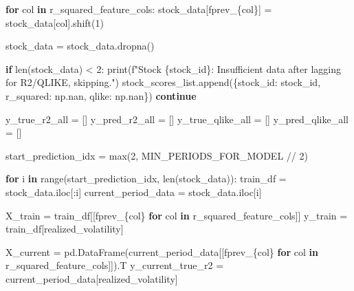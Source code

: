 \documentclass[
  letterpaper,
  DIV=11,
  numbers=noendperiod]{scrartcl}
\newenvironment{Shaded}{\begin{snugshade}}{\end{snugshade}}
\newcommand{\BuiltInTok}[1]{\textcolor[rgb]{0.00,0.23,0.31}{#1}}
\newcommand{\ControlFlowTok}[1]{\textcolor[rgb]{0.00,0.23,0.31}{\textbf{#1}}}
\newcommand{\DecValTok}[1]{\textcolor[rgb]{0.68,0.00,0.00}{#1}}
\newcommand{\KeywordTok}[1]{\textcolor[rgb]{0.00,0.23,0.31}{\textbf{#1}}}
\newcommand{\NormalTok}[1]{\textcolor[rgb]{0.00,0.23,0.31}{#1}}
\newcommand{\OperatorTok}[1]{\textcolor[rgb]{0.37,0.37,0.37}{#1}}
\newcommand{\SpecialCharTok}[1]{\textcolor[rgb]{0.37,0.37,0.37}{#1}}
\newcommand{\SpecialStringTok}[1]{\textcolor[rgb]{0.13,0.47,0.30}{#1}}
\newcommand{\StringTok}[1]{\textcolor[rgb]{0.13,0.47,0.30}{#1}}
\begin{document}
\begin{Shaded}
\begin{Highlighting}[]
    \ControlFlowTok{for}\NormalTok{ col }\KeywordTok{in}\NormalTok{ r\_squared\_feature\_cols:}
\NormalTok{        stock\_data[}\SpecialStringTok{f\textquotesingle{}prev\_}\SpecialCharTok{\{}\NormalTok{col}\SpecialCharTok{\}}\SpecialStringTok{\textquotesingle{}}\NormalTok{] }\OperatorTok{=}\NormalTok{ stock\_data[col].shift(}\DecValTok{1}\NormalTok{)}
    
\NormalTok{    stock\_data }\OperatorTok{=}\NormalTok{ stock\_data.dropna() }

    \ControlFlowTok{if} \BuiltInTok{len}\NormalTok{(stock\_data) }\OperatorTok{\textless{}} \DecValTok{2}\NormalTok{: }
        \BuiltInTok{print}\NormalTok{(}\SpecialStringTok{f"Stock }\SpecialCharTok{\{}\NormalTok{stock\_id}\SpecialCharTok{\}}\SpecialStringTok{: Insufficient data after lagging for R2/QLIKE, skipping."}\NormalTok{)}
\NormalTok{        stock\_scores\_list.append(\{}\StringTok{\textquotesingle{}stock\_id\textquotesingle{}}\NormalTok{: stock\_id, }\StringTok{\textquotesingle{}r\_squared\textquotesingle{}}\NormalTok{: np.nan, }\StringTok{\textquotesingle{}qlike\textquotesingle{}}\NormalTok{: np.nan\})}
        \ControlFlowTok{continue}

\NormalTok{    y\_true\_r2\_all }\OperatorTok{=}\NormalTok{ []}
\NormalTok{    y\_pred\_r2\_all }\OperatorTok{=}\NormalTok{ []}
\NormalTok{    y\_true\_qlike\_all }\OperatorTok{=}\NormalTok{ []}
\NormalTok{    y\_pred\_qlike\_all }\OperatorTok{=}\NormalTok{ []}

\NormalTok{    start\_prediction\_idx }\OperatorTok{=} \BuiltInTok{max}\NormalTok{(}\DecValTok{2}\NormalTok{, MIN\_PERIODS\_FOR\_MODEL }\OperatorTok{//} \DecValTok{2}\NormalTok{)}

    \ControlFlowTok{for}\NormalTok{ i }\KeywordTok{in} \BuiltInTok{range}\NormalTok{(start\_prediction\_idx, }\BuiltInTok{len}\NormalTok{(stock\_data)):}
\NormalTok{        train\_df }\OperatorTok{=}\NormalTok{ stock\_data.iloc[:i]}
\NormalTok{        current\_period\_data }\OperatorTok{=}\NormalTok{ stock\_data.iloc[i]}

\NormalTok{        X\_train }\OperatorTok{=}\NormalTok{ train\_df[[}\SpecialStringTok{f\textquotesingle{}prev\_}\SpecialCharTok{\{}\NormalTok{col}\SpecialCharTok{\}}\SpecialStringTok{\textquotesingle{}} \ControlFlowTok{for}\NormalTok{ col }\KeywordTok{in}\NormalTok{ r\_squared\_feature\_cols]]}
\NormalTok{        y\_train }\OperatorTok{=}\NormalTok{ train\_df[}\StringTok{\textquotesingle{}realized\_volatility\textquotesingle{}}\NormalTok{]}
        
\NormalTok{        X\_current }\OperatorTok{=}\NormalTok{ pd.DataFrame(current\_period\_data[[}\SpecialStringTok{f\textquotesingle{}prev\_}\SpecialCharTok{\{}\NormalTok{col}\SpecialCharTok{\}}\SpecialStringTok{\textquotesingle{}} \ControlFlowTok{for}\NormalTok{ col }\KeywordTok{in}\NormalTok{ r\_squared\_feature\_cols]]).T}
\NormalTok{        y\_current\_true\_r2 }\OperatorTok{=}\NormalTok{ current\_period\_data[}\StringTok{\textquotesingle{}realized\_volatility\textquotesingle{}}\NormalTok{]}


\end{Highlighting}
\end{Shaded}
\end{document}
